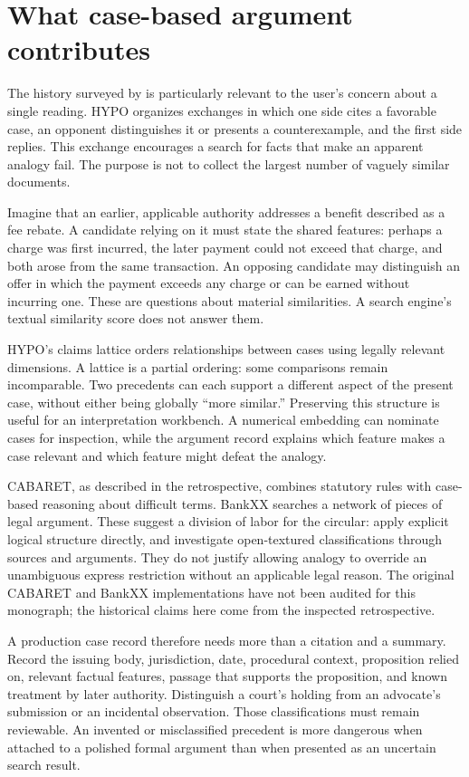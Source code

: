 \section{What case-based argument contributes}

The history surveyed by \citet[sections 2--3]{hypolegacy2017} is particularly
relevant to the user's concern about a single reading. HYPO organizes exchanges
in which one side cites a favorable case, an opponent distinguishes it or presents
a counterexample, and the first side replies. This exchange encourages a search
for facts that make an apparent analogy fail. The purpose is not to collect the
largest number of vaguely similar documents.

Imagine that an earlier, applicable authority addresses a benefit described as a
fee rebate. A candidate relying on it must state the shared features: perhaps a
charge was first incurred, the later payment could not exceed that charge, and
both arose from the same transaction. An opposing candidate may distinguish an
offer in which the payment exceeds any charge or can be earned without incurring
one. These are questions about material similarities. A search engine's textual
similarity score does not answer them.

HYPO's claims lattice orders relationships between cases using legally relevant
dimensions. A lattice is a partial ordering: some comparisons remain
incomparable. Two precedents can each support a different aspect of the present
case, without either being globally ``more similar.'' Preserving this structure
is useful for an interpretation workbench. A numerical embedding can nominate
cases for inspection, while the argument record explains which feature makes a
case relevant and which feature might defeat the analogy.

CABARET, as described in the retrospective, combines statutory rules with
case-based reasoning about difficult terms. BankXX searches a network of pieces
of legal argument. These suggest a division of labor for the circular: apply
explicit logical structure directly, and investigate open-textured classifications
through sources and arguments. They do not justify allowing analogy to override
an unambiguous express restriction without an applicable legal reason. The
original CABARET and BankXX implementations have not been audited for this
monograph; the historical claims here come from the inspected retrospective.

A production case record therefore needs more than a citation and a summary.
Record the issuing body, jurisdiction, date, procedural context, proposition
relied on, relevant factual features, passage that supports the proposition, and
known treatment by later authority. Distinguish a court's holding from an
advocate's submission or an incidental observation. Those classifications must
remain reviewable. An invented or misclassified precedent is more dangerous when
attached to a polished formal argument than when presented as an uncertain search
result.

